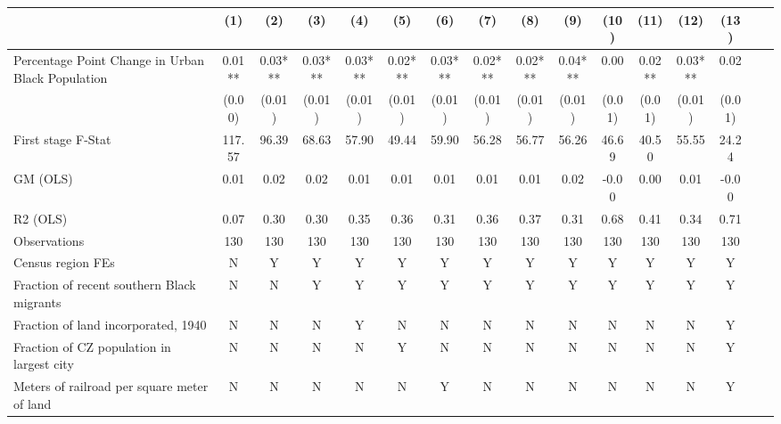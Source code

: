  \begin{tabular}{l*{15}{c}} \toprule
                    &\multicolumn{1}{c}{(1)}   &\multicolumn{1}{c}{(2)}   &\multicolumn{1}{c}{(3)}   &\multicolumn{1}{c}{(4)}   &\multicolumn{1}{c}{(5)}   &\multicolumn{1}{c}{(6)}   &\multicolumn{1}{c}{(7)}   &\multicolumn{1}{c}{(8)}   &\multicolumn{1}{c}{(9)}   &\multicolumn{1}{c}{(10)}   &\multicolumn{1}{c}{(11)}   &\multicolumn{1}{c}{(12)}   &\multicolumn{1}{c}{(13)}   \\
\midrule
Percentage Point Change in Urban Black Population&  0.01** &  0.03***&  0.03***&  0.03***&  0.02***&  0.03***&  0.02***&  0.02***&  0.04***&  0.00   &  0.02** &  0.03***&  0.02   \\
                    &(0.00)   &(0.01)   &(0.01)   &(0.01)   &(0.01)   &(0.01)   &(0.01)   &(0.01)   &(0.01)   &(0.01)   &(0.01)   &(0.01)   &(0.01)   \\
\midrule
First stage F-Stat  &117.57   & 96.39   & 68.63   & 57.90   & 49.44   & 59.90   & 56.28   & 56.77   & 56.26   & 46.69   & 40.50   & 55.55   & 24.24   \\
GM (OLS)            &  0.01   &  0.02   &  0.02   &  0.01   &  0.01   &  0.01   &  0.01   &  0.01   &  0.02   & -0.00   &  0.00   &  0.01   & -0.00   \\
R2 (OLS)            &  0.07   &  0.30   &  0.30   &  0.35   &  0.36   &  0.31   &  0.36   &  0.37   &  0.31   &  0.68   &  0.41   &  0.34   &  0.71   \\
Observations        &   130   &   130   &   130   &   130   &   130   &   130   &   130   &   130   &   130   &   130   &   130   &   130   &   130   \\
Census region FEs   &     N   &     Y   &     Y   &     Y   &     Y   &     Y   &     Y   &     Y   &     Y   &     Y   &     Y   &     Y   &     Y   \\
Fraction of recent southern Black migrants&     N   &     N   &     Y   &     Y   &     Y   &     Y   &     Y   &     Y   &     Y   &     Y   &     Y   &     Y   &     Y   \\
Fraction of land incorporated, 1940&     N   &     N   &     N   &     Y   &     N   &     N   &     N   &     N   &     N   &     N   &     N   &     N   &     Y   \\
Fraction of CZ population in largest city&     N   &     N   &     N   &     N   &     Y   &     N   &     N   &     N   &     N   &     N   &     N   &     N   &     Y   \\
Meters of railroad per square meter of land&     N   &     N   &     N   &     N   &     N   &     Y   &     N   &     N   &     N   &     N   &     N   &     N   &     Y   \\

\end{tabular}
